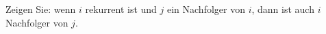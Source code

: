 \begin{Exercise}[label=ex:4.6]
Zeigen Sie: wenn $i$ rekurrent ist und $j$ ein Nachfolger von $i$, dann ist auch $i$ Nachfolger von $j$.
\end{Exercise}
\begin{Answer}
\end{Answer}
